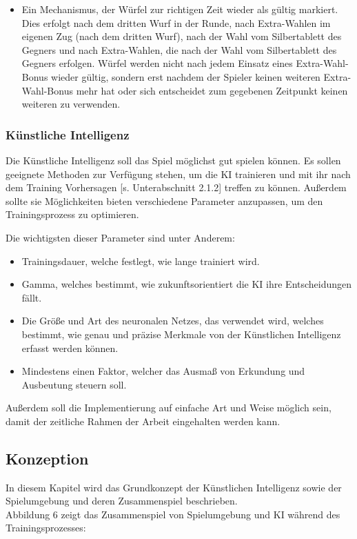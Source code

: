 \begin{itemize}
\item Ein Mechanismus, der Würfel zur richtigen Zeit wieder als gültig markiert. Dies erfolgt nach dem dritten Wurf in der Runde, nach Extra-Wahlen im eigenen Zug (nach dem dritten Wurf), nach der Wahl vom Silbertablett des Gegners und nach Extra-Wahlen, die nach der Wahl vom Silbertablett des Gegners erfolgen. Würfel werden nicht nach jedem Einsatz eines Extra-Wahl-Bonus wieder gültig, sondern erst nachdem der Spieler keinen weiteren Extra-Wahl-Bonus mehr hat oder sich entscheidet zum gegebenen Zeitpunkt keinen weiteren zu verwenden.
\end{itemize}
\subsubsection{Künstliche Intelligenz}
Die Künstliche Intelligenz soll das Spiel möglichst gut spielen können. Es sollen geeignete Methoden zur Verfügung stehen, um die KI trainieren und mit ihr nach dem Training Vorhersagen [s. Unterabschnitt 2.1.2] treffen zu können. Außerdem sollte sie Möglichkeiten bieten verschiedene Parameter anzupassen, um den Trainingsprozess zu optimieren.

Die wichtigsten dieser Parameter sind unter Anderem:
\begin{itemize} 
\item Trainingsdauer, welche festlegt, wie lange trainiert wird.
\item Gamma, welches bestimmt, wie zukunftsorientiert die KI ihre Entscheidungen fällt. 
\item Die Größe und Art des neuronalen Netzes, das verwendet wird, welches bestimmt, wie genau und präzise Merkmale von der Künstlichen Intelligenz erfasst werden können.
\item Mindestens einen Faktor, welcher das Ausmaß von Erkundung und Ausbeutung steuern soll. 
\end{itemize}
Außerdem soll die Implementierung auf einfache Art und Weise möglich sein, damit der zeitliche Rahmen der Arbeit eingehalten werden kann.
\subsection{Konzeption}
In diesem Kapitel wird das Grundkonzept der Künstlichen Intelligenz sowie der Spielumgebung und deren Zusammenspiel beschrieben.\\

Abbildung 6 zeigt das Zusammenspiel von Spielumgebung und KI während des Trainingsprozesses:

